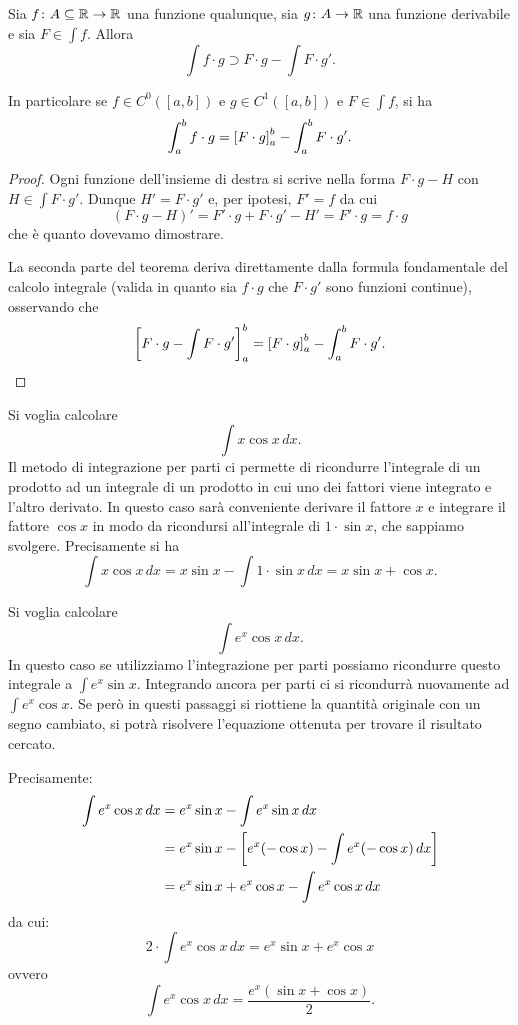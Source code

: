 \begin{theorem}
\mymark{*}
Sia $f\colon A\subseteq \mathbb R \to \mathbb R$ una funzione qualunque, sia $g\colon A \to\mathbb R$
una funzione derivabile
e sia $F \in \int f$.
Allora
\[
  \int f\cdot g \supset F \cdot g - \int F \cdot g'.
\]

In particolare se $f\in C^0([a,b])$ e $g\in C^1([a,b])$
e $F \in \int f$, si ha
\[
  \int_a^b f\cdot g = {\left[ F\cdot g \right]}_a^b - \int_a^b F \cdot g'.
\]
\end{theorem}
%
\begin{proof}
\mymark{*}
Ogni funzione dell'insieme di destra si scrive nella forma
$F\cdot g - H$ con $H \in \int F \cdot g'$.
Dunque $H' = F \cdot g'$ e, per ipotesi, $F'=f$ da cui
\[
(F\cdot g - H)' = F' \cdot g + F \cdot g' - H' = F' \cdot g
= f\cdot g
\]
che è quanto dovevamo dimostrare.

La seconda parte del teorema
deriva direttamente dalla formula fondamentale del calcolo integrale
(valida in quanto sia $f\cdot g$ che $F \cdot g'$ sono funzioni continue),
osservando che
\[
{\left[ F\cdot g - \int F \cdot g' \right]}_a^b
= {\left[ F\cdot g \right]}_a^b - \int_a^b F \cdot g'.
\]
\end{proof}

\begin{example}
Si voglia calcolare
\[
  \int x \cos x\, dx.
\]
Il metodo di integrazione per parti ci permette
di ricondurre l'integrale di un prodotto ad un integrale
di un prodotto in cui uno dei fattori viene integrato e l'altro derivato.
In questo caso sarà conveniente derivare il fattore $x$
e integrare il fattore $\cos x$ in modo da ricondursi all'integrale di
$1\cdot \sin x$, che sappiamo svolgere.
Precisamente si ha
\[
 \int x \cos x\, dx = x \sin x - \int 1 \cdot \sin x \, dx
  = x \sin x + \cos x.
\]
\end{example}

\begin{example}
Si voglia calcolare
\[
 \int e^x \cos x\, dx.
\]
In questo caso se utilizziamo l'integrazione per parti possiamo ricondurre
questo integrale a $\int e^x \sin x$. Integrando ancora per parti ci si
ricondurrà nuovamente ad $\int e^x \cos x$. Se però in questi passaggi si
riottiene la quantità originale con un segno cambiato, si potrà risolvere
l'equazione ottenuta per trovare il risultato cercato.

Precisamente:
\begin{align*}
\int e^x \cos x\, dx
&= e^x \sin x - \int e^x \sin x\, dx\\
 &= e^x \sin x - {\left[ e^x(-\cos x) - \int e^x(-\cos x)\, dx \right]} \\
 &= e^x \sin x + e^x \cos x - \int e^x \cos x \, dx
\end{align*}
da cui:
\[
 2 \cdot \int e^x \cos x\, dx  = e^x \sin x + e^x \cos x
\]
ovvero
\[
  \int e^x \cos x\, dx = \frac{e^x(\sin x + \cos x)}{2}.
\]
\end{example}

